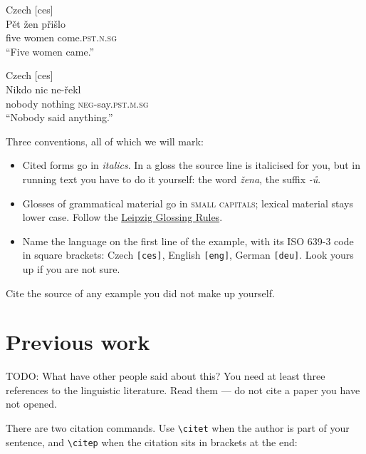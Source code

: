 \documentclass[a4paper,12pt]{article}
\newcommand{\gm}[1]{\textsc{\MakeLowercase{#1}}}
\begin{document}
\begin{exe}
  \ex Czech [ces] \\
      \gll Pět   žen     přišlo            \\
           five  women   come.\gm{pst}.\gm{n}.\gm{sg} \\
  \trans ``Five women came.''
\end{exe}

\begin{exe}
  \ex Czech [ces] \\
      \gll Nikdo   nic      ne-řekl          \\
           nobody  nothing  \gm{neg}-say.\gm{pst}.\gm{m}.\gm{sg} \\
  \trans ``Nobody said anything.''
\end{exe}

Three conventions, all of which we will mark:

\begin{itemize}
\item Cited forms go in \emph{italics}.  In a gloss the source line is
  italicised for you, but in running text you have to do it yourself:
  the word \emph{žena}, the suffix \emph{-ů}.
\item Glosses of grammatical material go in \gm{small capitals};
  lexical material stays lower case.  Follow the
  \href{https://www.eva.mpg.de/lingua/pdf/Glossing-Rules.pdf}{Leipzig
    Glossing Rules}.
\item Name the language on the first line of the example, with its
  ISO 639-3 code in square brackets: Czech \texttt{[ces]}, English
  \texttt{[eng]}, German \texttt{[deu]}.  Look yours up if you are
  not sure.
\end{itemize}

Cite the source of any example you did not make up yourself.

\section{Previous work}

TODO: What have other people said about this?  You need at least three
references to the linguistic literature.  Read them --- do not cite a
paper you have not opened.

There are two citation commands.  Use \verb|\citet| when the author is
part of your sentence, and \verb|\citep| when the citation sits in
brackets at the end:
\end{document}
